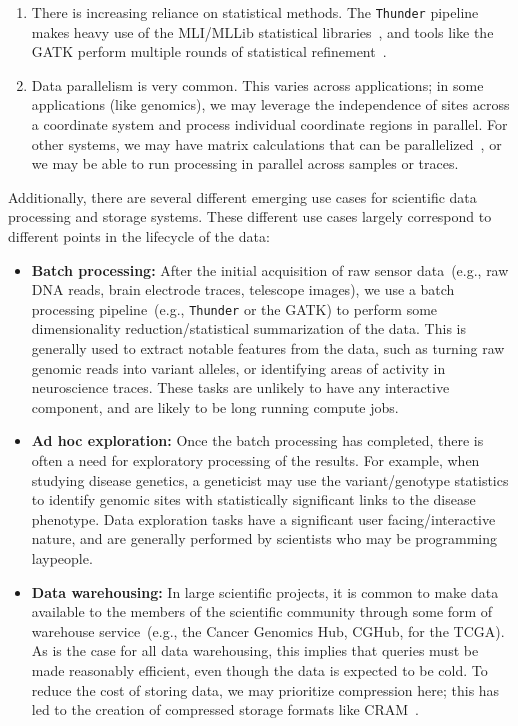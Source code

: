 \documentclass[10pt]{report} %
\begin{document}
\begin{enumerate}
\item There is increasing reliance on statistical methods. The \texttt{Thunder} pipeline makes heavy use
of the MLI/MLLib statistical libraries~\cite{freeman14, sparks13}, and tools like the GATK perform multiple
rounds of statistical refinement~\cite{depristo11}.
\item Data parallelism is very common. This varies across applications; in some applications (like
genomics), we may leverage the independence of sites across a coordinate system and process
individual coordinate regions in parallel. For other systems, we may have matrix calculations that can
be parallelized~\cite{sparks13}, or we may be able to run processing in parallel across samples or traces.
\end{enumerate}

Additionally, there are several different emerging use cases for scientific data processing and storage
systems. These different use cases largely correspond to different points in the lifecycle of the data:

\begin{itemize}
\item \textbf{Batch processing:} After the initial acquisition of raw sensor data~(e.g., raw DNA reads,
brain electrode traces, telescope images), we use a batch processing pipeline~(e.g., \texttt{Thunder} or
the GATK) to perform some dimensionality reduction/statistical summarization of the data. This is
generally used to extract notable features from the data, such as turning raw genomic reads into variant
alleles, or identifying areas of activity in neuroscience traces. These tasks are unlikely to have any
interactive component, and are likely to be long running compute jobs.
\item \textbf{Ad hoc exploration:} Once the batch processing has completed, there is often a need
for exploratory processing of the results. For example, when studying disease genetics, a geneticist may
use the variant/genotype statistics to identify genomic sites with statistically significant links to the
disease phenotype. Data exploration tasks have a significant user facing/interactive nature, and are
generally performed by scientists who may be programming laypeople.
\item \textbf{Data warehousing:} In large scientific projects, it is common to make data available to the
members of the scientific community through some form of warehouse service~(e.g., the Cancer
Genomics Hub, CGHub, for the TCGA). As is the case for all data warehousing, this implies that queries
must be made reasonably efficient, even though the data is expected to be cold. To reduce the cost of
storing data, we may prioritize compression here; this has led to the creation of compressed storage
formats like CRAM~\cite{fritz11}.
\end{itemize}
\end{document}
